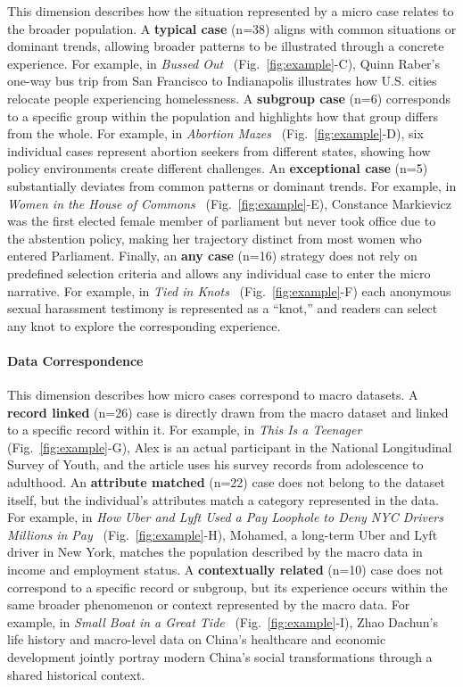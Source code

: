 This dimension describes how the situation represented by a micro case relates to the broader population. A \textbf{typical case} (n=38) aligns with common situations or dominant trends, allowing broader patterns to be illustrated through a concrete experience. For example, in \textit{Bussed Out}~\cite{gee2017bussed} (Fig.~\ref{fig:example}-C), Quinn Raber’s one-way bus trip from San Francisco to Indianapolis illustrates how U.S. cities relocate people experiencing homelessness. A \textbf{subgroup case} (n=6) corresponds to a specific group within the population and highlights how that group differs from the whole. For example, in \textit{Abortion Mazes}~\cite{diehm2024abortion} (Fig.~\ref{fig:example}-D), six individual cases represent abortion seekers from different states, showing how policy environments create different challenges. An \textbf{exceptional case} (n=5) substantially deviates from common patterns or dominant trends. For example, in \textit{Women in the House of Commons}~\cite{dsouza2018women} (Fig.~\ref{fig:example}-E), Constance Markievicz was the first elected female member of parliament but never took office due to the abstention policy, making her trajectory distinct from most women who entered Parliament. Finally, an \textbf{any case} (n=16) strategy does not rely on predefined selection criteria and allows any individual case to enter the micro narrative. For example, in \textit{Tied in Knots}~\cite{tiedinknots} (Fig.~\ref{fig:example}-F) each anonymous sexual harassment testimony is represented as a “knot,” and readers can select any knot to explore the corresponding experience.

\paragraph{\textbf{\textcolor{col}{Data Correspondence}}}

This dimension describes how micro cases correspond to macro datasets. A \textbf{record linked} (n=26) case is directly drawn from the macro dataset and linked to a specific record within it. For example, in \textit{This Is a Teenager}~\cite{chang2024teenager} (Fig.~\ref{fig:example}-G), Alex is an actual participant in the National Longitudinal Survey of Youth, and the article uses his survey records from adolescence to adulthood. An \textbf{attribute matched} (n=22) case does not belong to the dataset itself, but the individual’s attributes match a category represented in the data. For example, in \textit{How Uber and Lyft Used a Pay Loophole to Deny NYC Drivers Millions in Pay}~\cite{lung2024lockouts} (Fig.~\ref{fig:example}-H), Mohamed, a long-term Uber and Lyft driver in New York, matches the population described by the macro data in income and employment status. A \textbf{contextually related} (n=10) case does not correspond to a specific record or subgroup, but its experience occurs within the same broader phenomenon or context represented by the macro data. For example, in \textit{Small Boat in a Great Tide}~\cite{modernchronicle} (Fig.~\ref{fig:example}-I), Zhao Dachun’s life history and macro-level data on China’s healthcare and economic development jointly portray modern China’s social transformations through a shared historical context.

